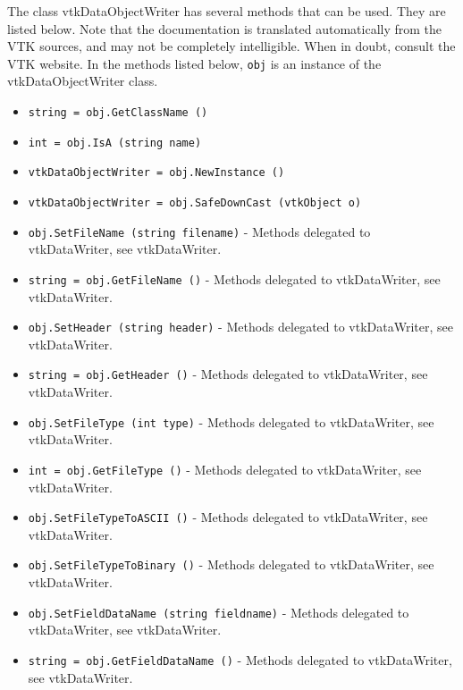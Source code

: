 The class vtkDataObjectWriter has several methods that can be used.
  They are listed below.
Note that the documentation is translated automatically from the VTK sources,
and may not be completely intelligible.  When in doubt, consult the VTK website.
In the methods listed below, \verb|obj| is an instance of the vtkDataObjectWriter class.
\begin{itemize}
\item  \verb|string = obj.GetClassName ()|

\item  \verb|int = obj.IsA (string name)|

\item  \verb|vtkDataObjectWriter = obj.NewInstance ()|

\item  \verb|vtkDataObjectWriter = obj.SafeDownCast (vtkObject o)|

\item  \verb|obj.SetFileName (string filename)| -  Methods delegated to vtkDataWriter, see vtkDataWriter.

\item  \verb|string = obj.GetFileName ()| -  Methods delegated to vtkDataWriter, see vtkDataWriter.

\item  \verb|obj.SetHeader (string header)| -  Methods delegated to vtkDataWriter, see vtkDataWriter.

\item  \verb|string = obj.GetHeader ()| -  Methods delegated to vtkDataWriter, see vtkDataWriter.

\item  \verb|obj.SetFileType (int type)| -  Methods delegated to vtkDataWriter, see vtkDataWriter.

\item  \verb|int = obj.GetFileType ()| -  Methods delegated to vtkDataWriter, see vtkDataWriter.

\item  \verb|obj.SetFileTypeToASCII ()| -  Methods delegated to vtkDataWriter, see vtkDataWriter.

\item  \verb|obj.SetFileTypeToBinary ()| -  Methods delegated to vtkDataWriter, see vtkDataWriter.

\item  \verb|obj.SetFieldDataName (string fieldname)| -  Methods delegated to vtkDataWriter, see vtkDataWriter.

\item  \verb|string = obj.GetFieldDataName ()| -  Methods delegated to vtkDataWriter, see vtkDataWriter.

\end{itemize}

